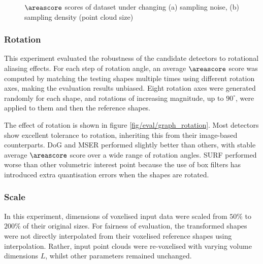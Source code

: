 \begin{figure}[ht]
\begin{subfigure}[t]{0.48\linewidth}
		\label{fig/eval/graph_sample}
	\end{subfigure}
	\caption{$\areascore$ scores of \meshset dataset under changing (a) sampling noise, (b) sampling density (point cloud size)}
	\label{fig/eval/graph_graph0} 
\end{figure}

\subsubsection{Rotation}

This experiment evaluated the robustness of the candidate detectors to rotational aliasing effects. For each step of rotation angle, an average $\areascore$ score was computed by matching the testing shapes multiple times using different rotation axes, making the evaluation results unbiased. Eight rotation axes were generated randomly for each shape, and rotations of increasing magnitude, up to $90^\circ$, were applied to them and then the reference shapes. 

The effect of rotation is shown in figure \ref{fig/eval/graph_rotation}. Most detectors show excellent tolerance to rotation, inheriting this from their image-based counterparts. 
DoG and MSER performed slightly better than others, with stable average $\areascore$ score over a wide range of rotation angles. SURF performed worse than other volumetric interest point because the use of box filters has introduced extra quantisation errors when the shapes are rotated.

\subsubsection{Scale}

In this experiment, dimensions of voxelised input data were scaled from $50\%$ to $200\%$ of their original sizes. For fairness of evaluation, the transformed shapes were not directly interpolated from their voxelised reference shapes using interpolation. Rather, input point clouds were re-voxelised with varying volume dimensions $L$, whilst other parameters remained unchanged. 

